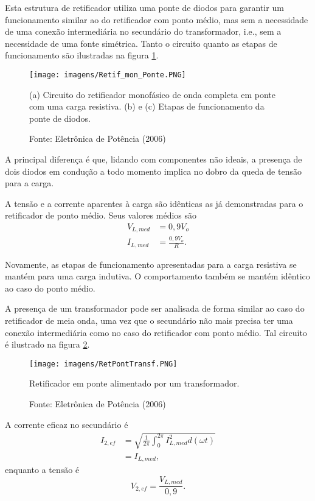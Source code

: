 Esta estrutura de retificador utiliza uma ponte de diodos para garantir um funcionamento similar ao do retificador com ponto médio, mas sem a necessidade de uma conexão intermediária no secundário do transformador, i.e., sem a necessidade de uma fonte simétrica. Tanto o circuito quanto as etapas de funcionamento são ilustradas na figura \ref{fig:CECT}.
 
\begin{figure}[ht]
    \center
    \texttt{[image: imagens/Retif\_mon\_Ponte.PNG]}
    \caption{(a) Circuito do retificador monofásico de onda completa em ponte com uma carga resistiva. (b) e (c) Etapas de funcionamento da ponte de diodos.}\label{fig:CECT}
    \caption*{Fonte: Eletrônica de Potência (2006)}
\end{figure}

A principal diferença é que, lidando com componentes não ideais, a presença de dois diodos em condução a todo momento implica no dobro da queda de tensão para a carga.

A tensão e a corrente aparentes à carga são idênticas as já demonstradas para o retificador de ponto médio. Seus valores médios são
\begin{align*}
    V_{L,med} &= 0,9V_o \\
    I_{L,med} &= \frac{0,9V_o}{R}
.\end{align*}

Novamente, as etapas de funcionamento apresentadas para a carga resistiva se mantém para uma carga indutiva. O comportamento também se mantém idêntico ao caso do ponto médio.

A presença de um transformador pode ser analisada de forma similar ao caso do retificador de meia onda, uma vez que o secundário não mais precisa ter uma conexão intermediária como no caso do retificador com ponto médio. Tal circuito é ilustrado na figura \ref{fig:RPAT}.

\begin{figure}[hb]
    \center
    \texttt{[image: imagens/RetPontTransf.PNG]}
    \caption{Retificador em ponte alimentado por um transformador.}\label{fig:RPAT}
    \caption*{Fonte: Eletrônica de Potência (2006)}
\end{figure}

A corrente eficaz no secundário é 
\begin{align*}
    I_{2,ef} &= \sqrt{ \frac{1}{2\pi} \int_0^{2\pi} I_{L,med}^2 d(\omega{t}) } \\
	      &= I_{L,med}
,\end{align*}
enquanto a tensão é \[
V_{2,ef} = \frac{V_{L,med}}{0,9}
.\] 

